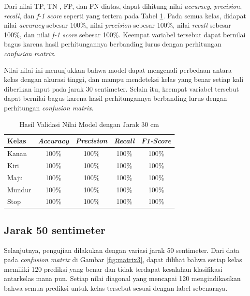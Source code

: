 Dari nilai TP, TN , FP, dan FN diatas, dapat dihitung nilai \emph{accuracy}, \emph{precision}, \emph{recall}, dan \emph{f-1 score} seperti yang tertera pada Tabel \ref{tb:vs_model2}. Pada semua kelas, didapat nilai \emph{accuracy} sebesar 100\%, nilai \emph{precision} sebesar 100\%, nilai \emph{recall} sebesar 100\%, dan nilai \emph{f-1 score} sebesar 100\%. Keempat variabel tersebut dapat bernilai bagus karena hasil perhitungannya berbanding lurus dengan perhitungan \emph{confusion matrix}. 

Nilai-nilai ini menunjukkan bahwa model dapat mengenali perbedaan antara kelas dengan akurasi tinggi, dan mampu mendeteksi kelas yang benar setiap kali diberikan input pada jarak 30 sentimeter. Selain itu, keempat variabel tersebut dapat bernilai bagus karena hasil perhitungannya berbanding lurus dengan perhitungan \emph{confusion matrix}. 

\begin{longtable}{|l|c|c|c|c|}
  \caption{Hasil Validasi Nilai Model dengan Jarak 30 cm}
  \label{tb:vs_model2} \\
  \hline
  \rowcolor[HTML]{C0C0C0} 
  \textbf{Kelas} & \textbf{\emph{Accuracy}} & \textbf{\emph{Precision}} & \textbf{\emph{Recall}} & \textbf{\emph{F1-Score}} \\ \hline
  Kanan    & 100\%            & 100\%             & 100\%           & 100\%            \\ \hline
  Kiri     & 100\%          & 100\%           & 100\%           & 100\%           \\ \hline
  Maju      & 100\%          & 100\%           & 100\%          & 100\%          \\ \hline
  Mundur     & 100\%            & 100\%             & 100\%           & 100\%            \\ \hline
  Stop  & 100\%            & 100\%             & 100\%           & 100\%            \\ \hline
\end{longtable}

\subsection{Jarak 50 sentimeter}

Selanjutnya, pengujian dilakukan dengan variasi jarak 50 sentimeter. Dari data pada \emph{confusion matrix} di Gambar \ref{fig:matrix3}, dapat dilihat bahwa setiap kelas memiliki 120 prediksi yang benar dan tidak terdapat kesalahan klasifikasi antarkelas mana pun. Setiap nilai diagonal yang mencapai 120 mengindikasikan bahwa semua prediksi untuk kelas tersebut sesuai dengan label sebenarnya. 

